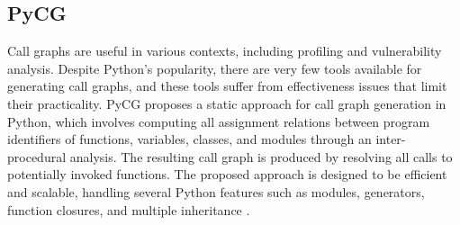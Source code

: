 \subsection{PyCG}
Call graphs are useful in various contexts, including profiling and vulnerability analysis.
Despite Python's popularity, there are very few tools available for generating call graphs, and these tools suffer from effectiveness issues that limit their practicality.
PyCG proposes a static approach for call graph generation in Python, which involves computing all assignment relations between program identifiers of functions, variables, classes, and modules through an inter-procedural analysis.
The resulting call graph is produced by resolving all calls to potentially invoked functions.
The proposed approach is designed to be efficient and scalable, handling several Python features such as modules, generators, function closures, and multiple inheritance \cite{PyCG_2021}.


